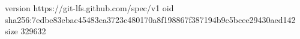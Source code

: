 version https://git-lfs.github.com/spec/v1
oid sha256:7edbe83ebac45483ea3723c480170a8f198867f387194b9c5bcee29430aed142
size 329632

